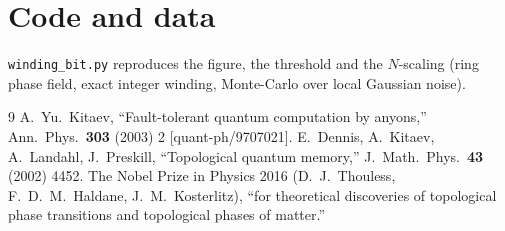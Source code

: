\documentclass[11pt,a4paper]{article}
\begin{document}
\section*{Code and data}
\texttt{winding\_bit.py} reproduces the figure, the threshold and the
$N$-scaling (ring phase field, exact integer winding, Monte-Carlo over
local Gaussian noise).

\begin{thebibliography}{9}\small
{} A.~Yu.~Kitaev, ``Fault-tolerant quantum computation by
  anyons,'' Ann.\ Phys.\ \textbf{303} (2003) 2 [quant-ph/9707021].
 E.~Dennis, A.~Kitaev, A.~Landahl, J.~Preskill,
  ``Topological quantum memory,'' J.\ Math.\ Phys.\ \textbf{43} (2002)
  4452.
 The Nobel Prize in Physics 2016 (D.~J.~Thouless,
  F.~D.~M.~Haldane, J.~M.~Kosterlitz), ``for theoretical discoveries of
  topological phase transitions and topological phases of matter.''
\end{thebibliography}
\end{document}
